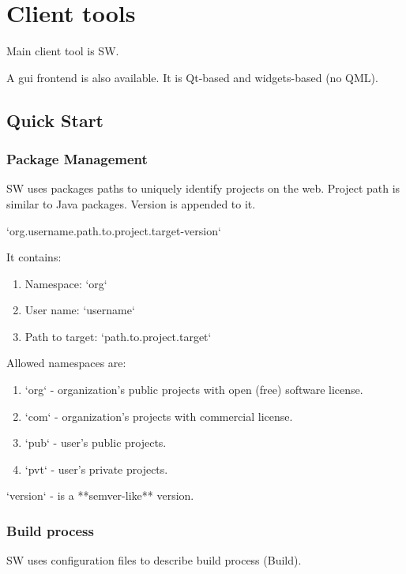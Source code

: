 

\chapter{Client tools}

Main client tool is SW.

A gui frontend is also available. It is Qt-based and widgets-based (no QML).

\section{Quick Start}



\subsection{Package Management}

SW uses packages paths to uniquely identify projects on the web.
Project path is similar to Java packages. Version is appended to it.

`org.username.path.to.project.target-version`

It contains:
\begin{enumerate}
\item
Namespace: `org`
\item
User name: `username`
\item
Path to target: `path.to.project.target`
\end{enumerate}

Allowed namespaces are:
\begin{enumerate}
\item
`org` - organization's public projects with open (free) software license.
\item
`com` - organization's projects with commercial license.
\item
`pub` - user's public projects.
\item
`pvt` - user's private projects.
\end{enumerate}

`version` - is a **semver-like** version.

\subsection{Build process}

SW uses configuration files to describe build process (Build).

